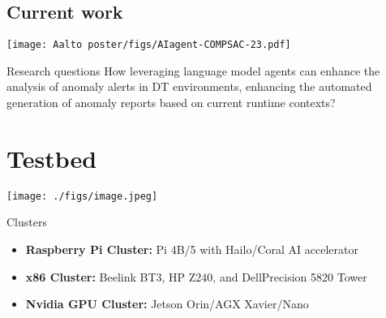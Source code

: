 \documentclass[landscape,a0,final]{a0poster} %
\begin{document}
\begin{minipage}{0.98\linewidth}
\begin{minipage}[t]{0.3\linewidth}
\subsection*{Current work}
\vspace{-20pt}
\begin{center}
    \texttt{[image: Aalto poster/figs/AIagent-COMPSAC-23.pdf]}
\end{center}
\begin{myframe}{Research questions}
  How leveraging language model agents can enhance the analysis of anomaly alerts in DT environments, enhancing the automated generation of anomaly reports based on current runtime contexts?
\end{myframe}
\section{Testbed}
\vspace{-20pt}
\begin{center}
\texttt{[image: ./figs/image.jpeg]}
\end{center}

\begin{myframe}{Clusters}
    \begin{itemize}
        \item \textbf{Raspberry Pi Cluster:} Pi 4B/5 with Hailo/Coral AI accelerator
        \item \textbf{x86 Cluster:} Beelink BT3, HP Z240, and DellPrecision 5820 Tower 
        \item \textbf{Nvidia GPU Cluster:} Jetson Orin/AGX Xavier/Nano
    \end{itemize}
\end{myframe}

\end{minipage}
\end{minipage} %


\vspace*{0.01\linewidth} %
\end{document}

